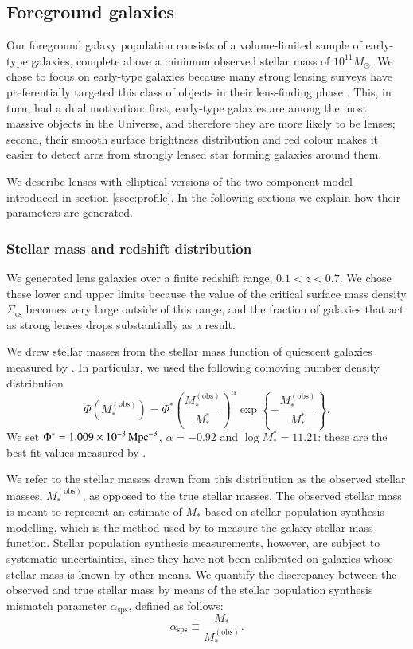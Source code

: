 \documentclass{aa}
\def\mstar{M_*}
\def\asps{\alpha_{\mathrm{sps}}}
\def\mobs{M_*^{(\mathrm{obs})}}
\begin{document}
\subsection{Foreground galaxies}\label{ssec:lenses}

Our foreground galaxy population consists of a volume-limited sample of early-type galaxies, complete above a minimum observed stellar mass of $10^{11}M_\odot$.
We chose to focus on early-type galaxies because many strong lensing surveys have preferentially targeted this class of objects in their lens-finding phase \citep[e.g.][]{Bol++06,Gav++12,Son++18a}.
This, in turn, had a dual motivation:
first, early-type galaxies are among the most massive objects in the Universe, and therefore they are more likely to be lenses;
second, their smooth surface brightness distribution and red colour makes it easier to detect arcs from strongly lensed star forming galaxies around them.

We describe lenses with elliptical versions of the two-component model introduced in section \ref{ssec:profile}.
In the following sections we explain how their parameters are generated.

\subsubsection{Stellar mass and redshift distribution}\label{ssub:mstarz}

We generated lens galaxies over a finite redshift range, $0.1 < z < 0.7$.
We chose these lower and upper limits because the value of the critical surface mass density $\Sigma_{\mathrm{cs}}$ becomes very large outside of this range, and the fraction of galaxies that act as strong lenses drops substantially as a result.

We drew stellar masses from the stellar mass function of quiescent galaxies measured by \citet{Muz++13}.
In particular, we used the following comoving number density distribution
\begin{equation}
\Phi(\mobs) = \Phi^*\left(\frac{\mobs}{\mstar^*}\right)^{\alpha} \exp{\left\{-\frac{\mobs}{\mstar^*}\right\}}.
\end{equation}
We set $\Phi^*=1.009\times10^{-3}\,{\rm Mpc}^{-3}$, $\alpha=-0.92$ and $\log{\mstar^*}=11.21$: these are the best-fit values measured by \citet{Muz++13}.

We refer to the stellar masses drawn from this distribution as the observed stellar masses, $\mobs$, as opposed to the true stellar masses.
The observed stellar mass is meant to represent an estimate of $\mstar$ based on stellar population synthesis modelling, which is the method used by \citet{Muz++13} to measure the galaxy stellar mass function.
Stellar population synthesis measurements, however, are subject to systematic uncertainties, since they have not been calibrated on galaxies whose stellar mass is known by other means.
We quantify the discrepancy between the observed and true stellar mass by means of the stellar population synthesis mismatch parameter $\asps$, defined as follows:
\begin{equation}
\asps \equiv \frac{\mstar}{\mobs}.
\end{equation}
\end{document}
